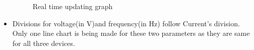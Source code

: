 \documentclass[a4paper,12pt,oneside]{book}
\begin{document}
\begin{itemize}
	\begin{figure}%
		\centering
		\qquad
		\caption{Real time updating graph}%
		\label{27}%
	\end{figure}
	
	\item{Divisions for voltage(in V)and frequency(in Hz) follow Current's division.	
		\\ Only one line chart is being made for these two parameters as they are same for all three devices.}
	

\end{itemize}
\end{document}
